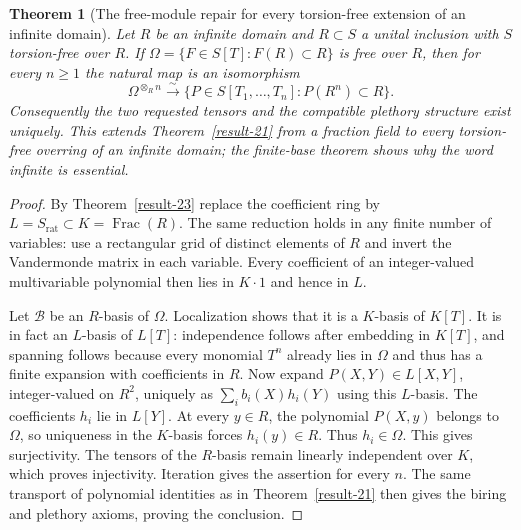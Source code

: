 \documentclass[11pt,a4paper]{article}
\newtheorem{theorem}{Theorem}[section]
\theoremstyle{definition}
\begin{document}
\begin{theorem}[The free-module repair for every torsion-free extension of an infinite domain]\label{result-24}
Let $R$ be an infinite domain and $R\subset S$ a unital inclusion
with $S$ torsion-free over $R$. If
$\Omega=\{F\in S[T]:F(R)\subset R\}$ is free over $R$, then
for every $n\ge1$ the natural map is an isomorphism
\[
 \Omega^{\otimes_R n}\xrightarrow{\sim}
 \{P\in S[T_1,\ldots,T_n]:P(R^n)\subset R\}.
\]
Consequently the two requested tensors and the compatible plethory
structure exist uniquely. This extends Theorem~\ref{result-21} from a fraction field
to every torsion-free overring of an infinite domain; the finite-base theorem shows why the word infinite is essential.
\end{theorem}
\begin{proof}
By Theorem~\ref{result-23} replace the coefficient ring by
$L=S_{\mathrm{rat}}\subset K=\operatorname{Frac}(R)$.
The same reduction holds in any finite number of variables:
use a rectangular grid of distinct elements of $R$ and invert
the Vandermonde matrix in each variable. Every coefficient of an
integer-valued multivariable polynomial then lies in $K\cdot1$
and hence in $L$.

Let $\mathcal B$ be an $R$-basis of $\Omega$. Localization shows
that it is a $K$-basis of $K[T]$. It is in fact an $L$-basis of
$L[T]$: independence follows after embedding in $K[T]$, and
spanning follows because every monomial $T^n$ already lies in
$\Omega$ and thus has a finite expansion with coefficients in $R$.
Now expand $P(X,Y)\in L[X,Y]$, integer-valued on $R^2$, uniquely
as $\sum_i b_i(X)h_i(Y)$ using this $L$-basis. The coefficients
$h_i$ lie in $L[Y]$. At every $y\in R$, the polynomial $P(X,y)$
belongs to $\Omega$, so uniqueness in the $K$-basis forces
$h_i(y)\in R$. Thus $h_i\in\Omega$. This gives surjectivity.
The tensors of the $R$-basis remain linearly independent over $K$,
which proves injectivity. Iteration gives the assertion for every
$n$. The same transport of polynomial identities as in Theorem~\ref{result-21}
then gives the biring and plethory axioms, proving the conclusion.
\end{proof}
\end{document}
